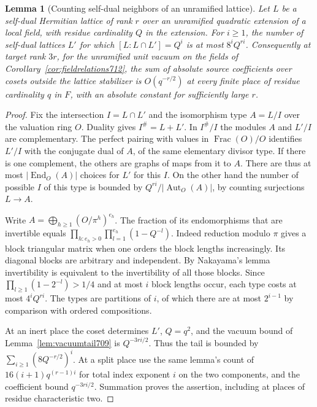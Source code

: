\documentclass[a4paper,11pt]{article}
\newtheorem{lemma}[proposition]{Lemma}
\theoremstyle{definition}
\theoremstyle{remark}
\numberwithin{equation}{section}
\begin{document}
\begin{lemma}[Counting self-dual neighbors of an unramified lattice]
\leavevmode\label{lem:selfdualtail813}
Let \(L\) be a self-dual Hermitian lattice of rank \(r\) over
an unramified quadratic extension of a local field, with
residue cardinality \(Q\) in the extension. For \(i\ge1\),
the number of self-dual lattices \(L'\) for which
\([L:L\cap L']=Q^i\) is at most \(8^iQ^{ri}\).
Consequently at target rank \(3r\), for the unramified unit
vacuum on the fields of Corollary~\ref{cor:fieldrelations712},
the sum of absolute source coefficients over cosets outside
the lattice stabilizer is \(O(q^{-r/2})\) at every finite
place of residue cardinality \(q\) in \(F\), with an absolute
constant for sufficiently large \(r\).
\end{lemma}
\begin{proof}
Fix the intersection \(I=L\cap L'\) and the isomorphism type
\(A=L/I\) over the valuation ring \(O\). Duality gives
\(I^\#=L+L'\). In \(I^\#/I\) the modules \(A\) and \(L'/I\)
are complementary. The perfect pairing with values in
\(\operatorname{Frac}(O)/O\) identifies \(L'/I\) with the
conjugate dual of \(A\), of the same elementary divisor type.
If there is one complement, the others are graphs of maps
from it to \(A\). There are thus at most
\(|\operatorname{End}_O(A)|\) choices for \(L'\) for this \(I\).
On the other hand the number of possible \(I\) of this type
is bounded by \(Q^{ri}/|\operatorname{Aut}_O(A)|\), by
counting surjections \(L\to A\).

Write \(A=\bigoplus_{h\ge1}(O/\pi^h)^{e_h}\).
The fraction of its endomorphisms that are invertible equals
\(\prod_{h:e_h>0}\prod_{l=1}^{e_h}(1-Q^{-l})\).
Indeed reduction modulo \(\pi\) gives a block triangular
matrix when one orders the block lengths increasingly.
Its diagonal blocks are arbitrary and independent. By
Nakayama's lemma invertibility is equivalent to the
invertibility of all those blocks. Since
\(\prod_{l\ge1}(1-2^{-l})>1/4\) and at most \(i\) block
lengths occur, each type costs at most \(4^i Q^{ri}\).
The types are partitions of \(i\), of which there are at
most \(2^{i-1}\) by comparison with ordered compositions.

At an inert place the coset determines \(L'\), \(Q=q^2\),
and the vacuum bound of Lemma~\ref{lem:vacuumtail709} is
\(Q^{-3ri/2}\). Thus the tail is bounded by
\(\sum_{i\ge1}(8Q^{-r/2})^i\).
At a split place use the same lemma's count of
\(16(i+1)q^{(r-1)i}\) for total index exponent \(i\) on
the two components, and the coefficient bound
\(q^{-3ri/2}\). Summation proves the assertion, including
at places of residue characteristic two.
\end{proof}
\end{document}

